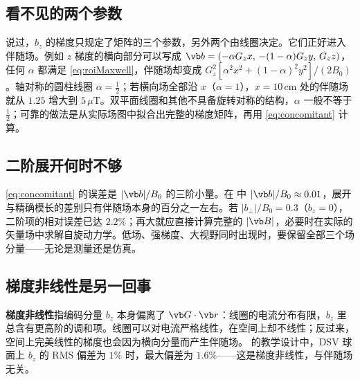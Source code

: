 
\subsection{看不见的两个参数}
 说过，$b_z$ 的梯度只规定了矩阵的三个参数，另外两个由线圈决定。它们正好进入伴随场。例如 $z$ 梯度的横向部分可以写成 $\vb b=(-\alpha G_zx,\,-(1-\alpha)G_zy,\,G_zz)$，任何 $\alpha$ 都满足 \eqref{eq:roiMaxwell}，伴随场却变成 $G_z^2[\alpha^2x^2+(1-\alpha)^2y^2]/(2B_0)$。轴对称的圆柱线圈 $\alpha=\tfrac12$；若横向场全部沿 $x$（$\alpha=1$），$x=10\,\mathrm{cm}$ 处的伴随场就从 $1.25$ 增大到 $5\,\mu\mathrm T$。双平面线圈和其他不具备旋转对称的结构，$\alpha$ 一般不等于 $\tfrac12$；可靠的做法是从实际场图中拟合出完整的梯度矩阵，再用 \eqref{eq:concomitant} 计算。

\subsection{二阶展开何时不够}
\eqref{eq:concomitant} 的误差是 $|\vb b|/B_0$ 的三阶小量。在 中 $|\vb b|/B_0\approx0.01$，展开与精确模长的差别只有伴随场本身的百分之一左右。若 $|b_\perp|/B_0=0.3$（$b_z=0$），二阶项的相对误差已达 $2.2\%$；再大就应直接计算完整的 $|\vb B|$，必要时在实际的矢量场中求解自旋动力学。低场、强梯度、大视野同时出现时，要保留全部三个场分量——无论是测量还是仿真。

\subsection{梯度非线性是另一回事}
\textbf{梯度非线性}指编码分量 $b_z$ 本身偏离了 $\vb G\cdot\vb r$：线圈的电流分布有限，$b_z$ 里总含有更高阶的调和项。线圈可以对电流严格线性，在空间上却不线性；反过来，空间上完美线性的梯度也会因为横向分量而产生伴随场。 的教学设计中，DSV 球面上 $b_z$ 的 RMS 偏差为 $1\%$ 时，最大偏差为 $1.6\%$——这是梯度非线性，与伴随场无关。

